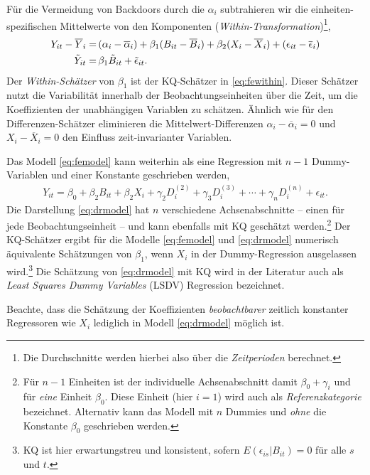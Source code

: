 \documentclass[
  a4paper,
  DIV=11,
  oneside]{scrreprt}
\begin{document}
Für die Vermeidung von Backdoors durch die \(\alpha_i\) subtrahieren wir
die einheiten-spezifischen Mittelwerte von den Komponenten
(\emph{Within-Transformation})\footnote{Die Durchschnitte werden hierbei
  also über die \emph{Zeitperioden} berechnet.}, \begin{align}
  Y_{it} - \overline{Y}_i =&\, (\alpha_i - \overline{\alpha}_i) + \beta_1 (B_{it} - \overline{B}_i) + \beta_2 (X_i - \overline{X}_i) + (\epsilon_{it} - \overline{\epsilon}_i)\notag\\
  \tilde Y_{it} =&\, \beta_1 \tilde B_{it} + \tilde\epsilon_{it}.\label{eq:fewithin}
\end{align} Der \emph{Within-Schätzer} von \(\beta_1\) ist der
KQ-Schätzer in \eqref{eq:fewithin}. Dieser Schätzer nutzt die
Variabilität innerhalb der Beobachtungseinheiten über die Zeit, um die
Koeffizienten der unabhängigen Variablen zu schätzen. Ähnlich wie für
den Differenzen-Schätzer eliminieren die Mittelwert-Differenzen
\(\alpha_i - \overline{\alpha}_i=0\) und \(X_i - \overline{X}_i=0\) den
Einfluss zeit-invarianter Variablen.

Das Modell \eqref{eq:femodel} kann weiterhin als eine Regression mit
\(n-1\) Dummy-Variablen und einer Konstante geschrieben werden,
\begin{align}
  Y_{it} = \beta_0 + \beta_2 B_{it} + \beta_2 X_i  + \gamma_2 D^{(2)}_i + \gamma_3 D^{(3)}_i + \cdots + \gamma_n D^{(n)}_i + \epsilon_{it} \label{eq:drmodel}.
\end{align} Die Darstellung \eqref{eq:drmodel} hat \(n\) verschiedene
Achsenabschnitte -- einen für jede Beobachtungseinheit -- und kann
ebenfalls mit KQ geschätzt werden.\footnote{Für \(n-1\) Einheiten ist
  der individuelle Achsenabschnitt damit \(\beta_0 + \gamma_i\) und für
  \emph{eine} Einheit \(\beta_0\). Diese Einheit (hier \(i=1\)) wird
  auch als \emph{Referenzkategorie} bezeichnet. Alternativ kann das
  Modell mit \(n\) Dummies und \emph{ohne} die Konstante \(\beta_0\)
  geschrieben werden.} Der KQ-Schätzer ergibt für die Modelle
\eqref{eq:femodel} und \eqref{eq:drmodel} numerisch äquivalente
Schätzungen von \(\beta_1\), wenn \(X_i\) in der Dummy-Regression
ausgelassen wird.\footnote{KQ ist hier erwartungstreu und konsistent,
  sofern \(E(\epsilon_{is}\vert B_{it})=0\) für alle \(s\) und \(t\).}
Die Schätzung von \eqref{eq:drmodel} mit KQ wird in der Literatur auch
als \emph{Least Squares Dummy Variables} (LSDV) Regression bezeichnet.

Beachte, dass die Schätzung der Koeffizienten \emph{beobachtbarer}
zeitlich konstanter Regressoren wie \(X_{i}\) lediglich in Modell
\eqref{eq:drmodel} möglich ist.
\end{document}
